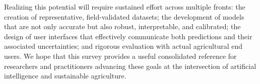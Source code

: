 \documentclass[journal]{IEEEtran}
\begin{document}
Realizing this potential will require sustained effort across multiple fronts: the creation of representative, field-validated datasets; the development of models that are not only accurate but also robust, interpretable, and calibrated; the design of user interfaces that effectively communicate both predictions and their associated uncertainties; and rigorous evaluation with actual agricultural end users. We hope that this survey provides a useful consolidated reference for researchers and practitioners advancing these goals at the intersection of artificial intelligence and sustainable agriculture.


\balance


\end{document}
